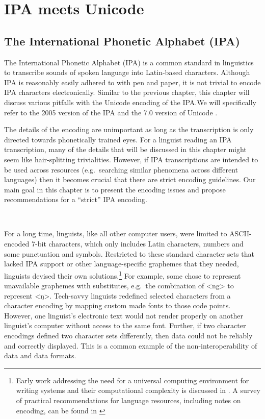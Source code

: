 \chapter{IPA meets Unicode}
\label{ipa-meets-unicode}

\section{The International Phonetic Alphabet (IPA)}
\label{the-international-phonetic-alphabet}

The International Phonetic Alphabet (IPA) is a common standard in linguistics to
transcribe sounds of spoken language into Latin-based characters. Although IPA
is reasonably easily adhered to with pen and paper, it is not trivial to encode
IPA characters electronically. Similar to the previous chapter, this chapter
will discuss various pitfalls with the Unicode encoding of the IPA.\@ We will
specifically refer to the 2005 version of the IPA \citep{IPA2005} and the 7.0 
version of Unicode \citet{Unicode2014}.

The details of the encoding are unimportant as long as the
transcription is only directed towards phonetically trained eyes. For a linguist
reading an IPA transcription, many of the details that will be discussed in this
chapter might seem like hair-splitting trivialities. However, if IPA
transcriptions are intended to be used across resources (e.g.~searching similar
phenomena across different languages) then it becomes crucial that there are strict
encoding guidelines. Our main goal in this chapter is to present the encoding
issues and propose recommendations for a ``strict'' IPA encoding.

\ 

\noindent For a long time, linguists, like all other computer users, were
limited to ASCII-encoded 7-bit characters, which only includes Latin characters,
numbers and some punctuation and symbols. Restricted to these standard character
sets that lacked IPA support or other language-specific graphemes that they
needed, linguists devised their own solutions.\footnote{Early work addressing
the need for a universal computing environment for writing systems and their
computational complexity is discussed in \citet{Simons1989}. A survey of
practical recommendations for language resources, including notes on encoding,
can be found in \citet{BirdSimons2003}} For example, some chose to represent
unavailable graphemes with substitutes, e.g.~the combination of <ng> to
represent <ŋ>. Tech-savvy linguists redefined selected characters from a
character encoding by mapping custom made fonts to those code points. However,
one linguist's electronic text would not render properly on another linguist's
computer without access to the same font. Further, if two character encodings
defined two character sets differently, then data could not be reliably and
correctly displayed. This is a common example of the non-interoperability of
data and data formats.


